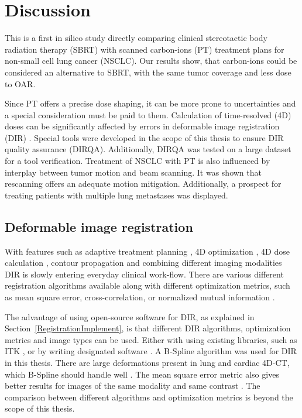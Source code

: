 \documentclass[type=dr, dr=rernat, accentcolor=tud7b,colorbacktitle, bigchapter, openright, twoside, 12pt ]{tudthesis}
\begin{document}
\chapter{Discussion}

This is a first in silico study directly comparing clinical stereotactic body radiation therapy (SBRT) with scanned carbon-ions (PT) treatment plans for non-small cell lung cancer (NSCLC). 
Our results show, that carbon-ions could be considered an alternative to SBRT, with the same tumor coverage and less dose to OAR.

Since PT offers a precise dose shaping, it can be more prone to uncertainties and a special consideration must be paid to them. Calculation of time-resolved (4D) doses can be significantly
affected by errors in deformable image registration (DIR) \cite{Heath2006}. Special tools were developed in the scope of this thesis to ensure DIR quality assurance (DIRQA). Additionally, DIRQA
was tested on a large dataset for a tool verification. Treatment of NSCLC with PT is also influenced by interplay between tumor motion and beam scanning. It was shown that rescanning offers an
adequate motion mitigation. Additionally, a prospect for treating patients with multiple lung metastases was displayed.

\section{Deformable image registration}


With features such as adaptive treatment planning \cite{Yan1997}, 4D optimization \cite{Trofimov2005}, 4D dose calculation \cite{Flampouri2006}, contour propagation \cite{Lu2006b} and
combining different imaging modalities \cite{Leibfarth2013} DIR is slowly entering everyday clinical work-flow. There are various different registration algorithms available \cite{Varadhan2013}
along with different optimization metrics, such as mean square error, cross-correlation, or normalized mutual information \cite{Glocker2011}.

The advantage of using open-source software for DIR, as explained in Section~\ref{RegistrationImplement}, is that different DIR algorithms, optimization metrics and image types can be used. Either with using
existing libraries, such as ITK \cite{Yoo2002}, or by writing designated software \cite{Fedorov2015}. A B-Spline algorithm was used for DIR in this thesis. There are large deformations present in lung and cardiac
4D-CT, which B-Spline should handle well \cite{Tang2013}. The mean square error metric also gives better results for images of the same modality and same contrast \cite{Varadhan2013}. 
The comparison between different algorithms and optimization metrics is beyond the scope of this thesis.
\end{document}
